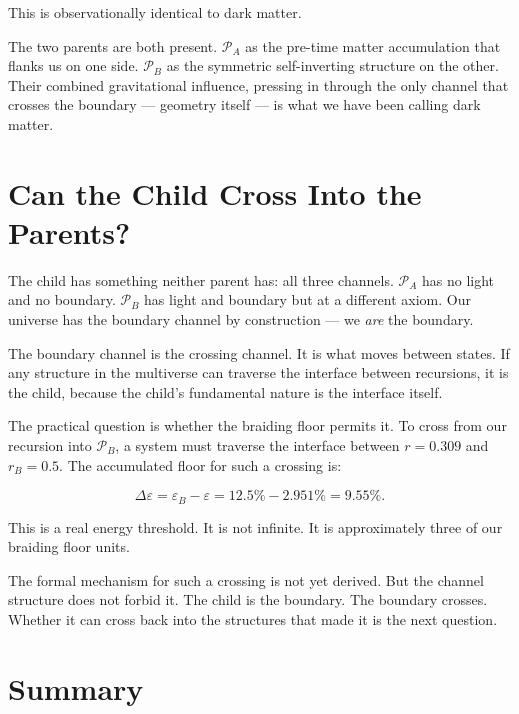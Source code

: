 \documentclass[prd,twocolumn,preprintnumbers,amsmath,amssymb]{revtex4-2}
\newcommand{\parentA}{\mathcal{P}_A}
\newcommand{\parentB}{\mathcal{P}_B}
\begin{document}
This is observationally identical to dark matter.

The two parents are both present. $\parentA$ as the pre-time matter
accumulation that flanks us on one side. $\parentB$ as the symmetric
self-inverting structure on the other. Their combined gravitational
influence, pressing in through the only channel that crosses the
boundary — geometry itself — is what we have been calling dark matter.

\section{Can the Child Cross Into the Parents?}

The child has something neither parent has: all three channels.
$\parentA$ has no light and no boundary. $\parentB$ has light and
boundary but at a different axiom. Our universe has the boundary
channel by construction — we \emph{are} the boundary.

The boundary channel is the crossing channel. It is what moves
between states. If any structure in the multiverse can traverse
the interface between recursions, it is the child, because the
child's fundamental nature is the interface itself.

The practical question is whether the braiding floor permits it.
To cross from our recursion into $\parentB$, a system must traverse
the interface between $r = 0.309$ and $r_B = 0.5$. The accumulated
floor for such a crossing is:

\begin{equation}
  \Delta\varepsilon = \varepsilon_B - \varepsilon = 12.5\% - 2.951\%
  = 9.55\%.
\end{equation}

This is a real energy threshold. It is not infinite. It is
approximately three of our braiding floor units.

The formal mechanism for such a crossing is not yet derived.
But the channel structure does not forbid it. The child is the
boundary. The boundary crosses. Whether it can cross back into
the structures that made it is the next question.

\section{Summary}
\end{document}
